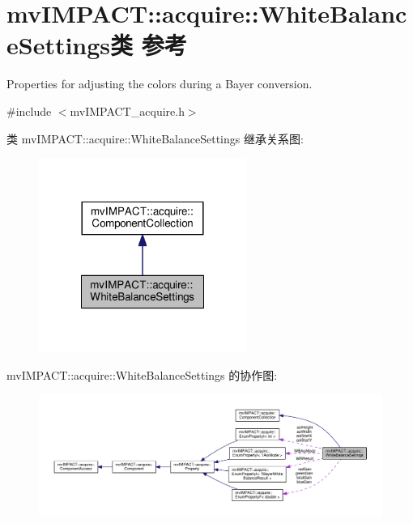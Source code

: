 \hypertarget{classmv_i_m_p_a_c_t_1_1acquire_1_1_white_balance_settings}{\section{mv\+I\+M\+P\+A\+C\+T\+:\+:acquire\+:\+:White\+Balance\+Settings类 参考}
\label{classmv_i_m_p_a_c_t_1_1acquire_1_1_white_balance_settings}
}


Properties for adjusting the colors during a Bayer conversion.  




{\ttfamily \#include $<$mv\+I\+M\+P\+A\+C\+T\+\_\+acquire.\+h$>$}



类 mv\+I\+M\+P\+A\+C\+T\+:\+:acquire\+:\+:White\+Balance\+Settings 继承关系图\+:
\nopagebreak
\begin{figure}[H]
\begin{center}
\leavevmode
\includegraphics[width=192pt]{classmv_i_m_p_a_c_t_1_1acquire_1_1_white_balance_settings__inherit__graph}
\end{center}
\end{figure}


mv\+I\+M\+P\+A\+C\+T\+:\+:acquire\+:\+:White\+Balance\+Settings 的协作图\+:
\nopagebreak
\begin{figure}[H]
\begin{center}
\leavevmode
\includegraphics[width=350pt]{classmv_i_m_p_a_c_t_1_1acquire_1_1_white_balance_settings__coll__graph}
\end{center}
\end{figure}
